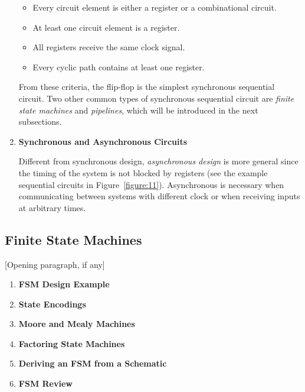 \documentclass[12pt]{article}
\begin{document}
\begin{enumerate}
  \begin{itemize}
    \item Every circuit element is either a register or a combinational circuit.
    \item At least one circuit element is a register.
    \item All registers receive the same clock signal.
    \item Every cyclic path contains at least one register.
  \end{itemize}

  From these criteria, the flip-flop is the simplest synchronous sequential circuit. Two other common types of synchronous sequential circuit are \textit{finite state machines} and \textit{pipelines}, which will be introduced in the next subsections.

  \item \textbf{Synchronous and Asynchronous Circuits}

  Different from synchronous design, \textit{asynchronous design} is more general since the timing of the system is not blocked by registers (see the example sequential circuits in Figure~\ref{figure:11}). Asynchronous is necessary when communicating between systems with different clock or when receiving inputs at arbitrary times.
\end{enumerate}

\subsection{Finite State Machines}

[Opening paragraph, if any]

\begin{enumerate}
  \item \textbf{FSM Design Example}

  \item \textbf{State Encodings}

  \item \textbf{Moore and Mealy Machines}


  \item \textbf{Factoring State Machines}

  \item \textbf{Deriving an FSM from a Schematic}

  \item \textbf{FSM Review}
\end{enumerate}
\end{document}
